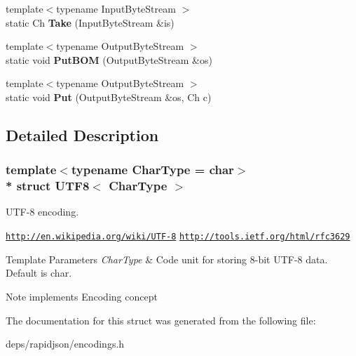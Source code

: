 \begin{DoxyCompactItemize}
\item 
{\footnotesize template$<$typename Input\+Byte\+Stream $>$ }\\static Ch {\bfseries Take} (Input\+Byte\+Stream \&is)\hypertarget{struct_u_t_f8_a5b2561a5031c8a699e593cd51b2c6864}{}\label{struct_u_t_f8_a5b2561a5031c8a699e593cd51b2c6864}

\item 
{\footnotesize template$<$typename Output\+Byte\+Stream $>$ }\\static void {\bfseries Put\+B\+OM} (Output\+Byte\+Stream \&os)\hypertarget{struct_u_t_f8_a6b171e5f0662ad81d498875bbdbc536a}{}\label{struct_u_t_f8_a6b171e5f0662ad81d498875bbdbc536a}

\item 
{\footnotesize template$<$typename Output\+Byte\+Stream $>$ }\\static void {\bfseries Put} (Output\+Byte\+Stream \&os, Ch c)\hypertarget{struct_u_t_f8_ab24c23227413798e9be28a21eb26fe51}{}\label{struct_u_t_f8_ab24c23227413798e9be28a21eb26fe51}

\end{DoxyCompactItemize}


\subsection{Detailed Description}
\subsubsection*{template$<$typename Char\+Type = char$>$\\*
struct U\+T\+F8$<$ Char\+Type $>$}

U\+T\+F-\/8 encoding. 

\href{http://en.wikipedia.org/wiki/UTF-8}{\tt http\+://en.\+wikipedia.\+org/wiki/\+U\+T\+F-\/8} \href{http://tools.ietf.org/html/rfc3629}{\tt http\+://tools.\+ietf.\+org/html/rfc3629} 
\begin{DoxyTemplParams}{Template Parameters}
{\em Char\+Type} & Code unit for storing 8-\/bit U\+T\+F-\/8 data. Default is char. \\
\hline
\end{DoxyTemplParams}
\begin{DoxyNote}{Note}
implements Encoding concept 
\end{DoxyNote}


The documentation for this struct was generated from the following file\+:\begin{DoxyCompactItemize}
\item 
deps/rapidjson/encodings.\+h\end{DoxyCompactItemize}
